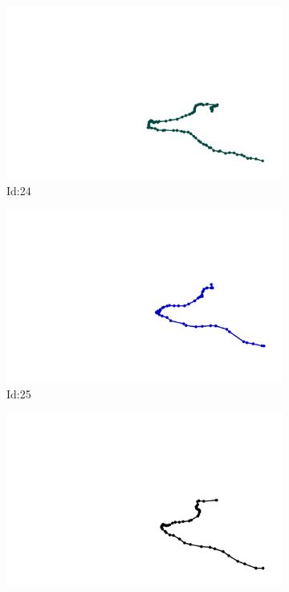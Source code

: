 \documentclass[12pt,twoside]{report}
\begin{document}
\begin{figure}
\centering
\begin{subfigure}[b]{0.20\textwidth}
\centering
\includegraphics[width=\textwidth]{../trajectories/24.png}
\caption{Id:24}
\end{subfigure}
\begin{subfigure}[b]{0.20\textwidth}
\centering
\includegraphics[width=\textwidth]{../trajectories/25.png}
\caption{Id:25}
\end{subfigure}
\begin{subfigure}[b]{0.20\textwidth}
\centering
\includegraphics[width=\textwidth]{../trajectories/35.png}

\end{subfigure}
\end{figure}
\end{document}

